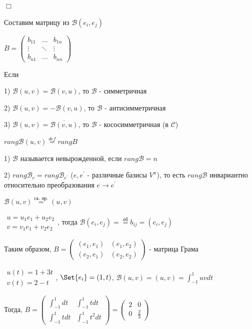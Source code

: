 \documentclass[12pt]{article}
\begin{document}
    $\Box$

    \Nota Составим матрицу из $\mathcal{B}(e_i, e_j)$

    $B = \begin{pmatrix}b_{11} & \dots & b_{1n} \\ \vdots & \ddots & \vdots \\ b_{n1} & \dots & b_{nn}\end{pmatrix}$

    \Def Если

    1) $\mathcal{B}(u, v) = \mathcal{B}(v, u)$, то $\mathcal{B}$ - симметричная

    2) $\mathcal{B}(u, v) = -\mathcal{B}(v, u)$, то $\mathcal{B}$ - антисимметричная

    3) $\mathcal{B}(u, v) = \overline{\mathcal{B}(v, u)}$, то $\mathcal{B}$ - кососимметричная (в $\mathcal{C}$)

    \Def $rang \mathcal{B}(u, v) \stackrel{def}{=} rang B$

    \Nota

    1) $\mathcal{B}$ называется невырожденной, если $rang \mathcal{B} = n$

    2) $rang \mathcal{B}_e = rang \mathcal{B}_{e^\prime} $ ($e, e^\prime$ - различные базисы $V^n$), то есть $rang \mathcal{B}$ инвариантно относительно преобразования $e \to e^\prime$

    \Ex $\mathcal{B}(u, v) \stackrel{\text{ск. пр.}}{=} (u, v)$

    $\begin{matrix}u = u_1 e_1 + u_2 e_2 \\ v = v_1 e_1 + v_2 e_2\end{matrix}$, тогда $\mathcal{B}(e_i, e_j) = \stackrel{\text{об}}{=} b_{ij} = (e_i, e_j)$

    Таким образом, $B = \begin{pmatrix}(e_1, e_1) & (e_1, e_2) \\ (e_2, e_1) & (e_2, e_2)\end{pmatrix}$ - матрица Грама

    \Ex $\begin{matrix}u(t) = 1 + 3t \\ v(t) = 2 - t\end{matrix}$, $\Set{e_i} = (1, t)$, $\mathcal{B}(u, v) = (u, v) = \int_{-1}^1 uv dt$

    Тогда, $B = \begin{pmatrix}\int_{-1}^1 dt & \int_{-1}^1 t dt \\ \int_{-1}^1 t dt & \int_{-1}^1 t^2 dt\end{pmatrix} = \begin{pmatrix}2 & 0 \\ 0 & \frac{2}{3}\end{pmatrix}$
\end{document}

